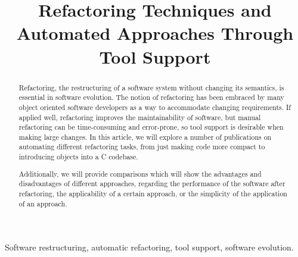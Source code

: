 \documentclass[conference,compsoc,a4paper]{IEEEtran}
\begin{document}
\title{Refactoring Techniques and Automated Approaches Through Tool Support}
\author{
  \and
}

\maketitle


\begin{abstract}
Refactoring, the restructuring of a software system without changing its semantics, is essential in software evolution. 
The notion of refactoring has been embraced by many object oriented software developers as a way to accommodate
changing requirements. If applied well, refactoring improves the maintainability of software, but manual refactoring 
can be time-consuming and error-prone, so tool support is desirable when making large changes. In this article, we will 
explore a number of publications on automating different refactoring tasks, from just making code more compact to 
introducing objects into a C codebase.

Additionally, we will provide comparisons which will show the advantages and disadvantages of different approaches, 
regarding the performance of the software after refactoring, the applicability of a certain approach, or the simplicity 
of the application of an approach.
\end{abstract}

\begin{IEEEkeywords}
Software restructuring, automatic refactoring, tool support, software evolution.
\end{IEEEkeywords}

%
\IEEEpeerreviewmaketitle
\end{document}

